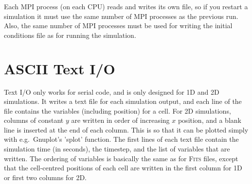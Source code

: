 \documentclass[a4paper,11pt]{report}
\begin{document}
Each MPI process (on each CPU) reads and writes its own file, so if you restart a simulation it must use the same number of MPI processes as the previous run.
Also, the same number of MPI processes must be used for writing the initial conditions file as for running the simulation.



\section{ASCII Text I/O}
Text I/O only works for serial code, and is only designed for 1D and 2D simulations.
It writes a text file for each simulation output, and each line of the file contains the variables (including position) for a cell.
For 2D simulations, columns of constant $y$ are written in order of increasing $x$ position, and a blank line is inserted at the end of each column.
This is so that it can be plotted simply with e.g.\ Gnuplot's 'splot' function.
The first lines of each text file contain the simulation time (in seconds), the timestep, and the list of variables that are written.
The ordering of variables is basically the same as for \textsc{Fits} files, except that the cell-centred positions of each cell are written in the first column for 1D or first two columns for 2D.





%

\end{document}
